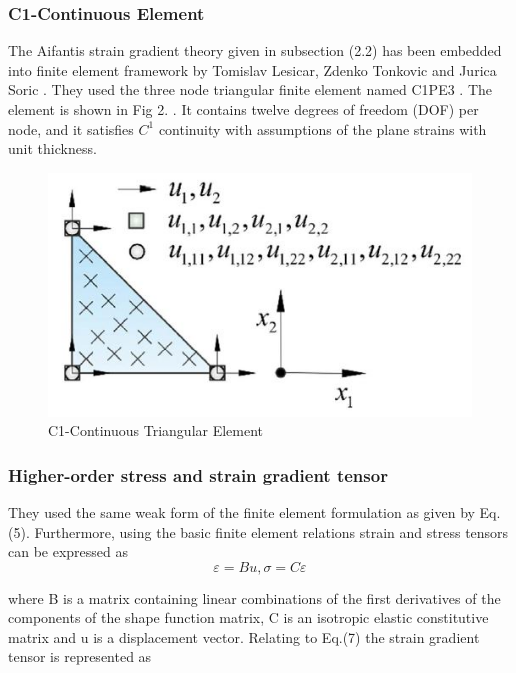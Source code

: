 \documentclass[12pt]{article}
\begin{document}
\subsubsection{ C1-Continuous Element}
The Aifantis strain gradient theory given in subsection (2.2) has been embedded into finite element framework by Tomislav Lesicar, Zdenko Tonkovic and Jurica Soric \cite{lesivcar2017two}. They used the three node triangular finite element named C1PE3 \cite{putar2017damage}. The element is shown in
Fig 2. \cite{putar2017damage}. It contains twelve degrees of freedom (DOF) per node, and it satisfies $C^1$ continuity with assumptions of the plane strains with unit thickness.
\newline
     \begin{figure}[H]
     	\begin{center}
	      \includegraphics[scale=0.8]{Tri_Element.JPG}  
	    \end{center}  
        \caption{C1-Continuous Triangular Element \cite{putar2017damage}}
     \end{figure}
\subsubsection{ Higher-order stress and strain gradient tensor} 
They used the same weak form of the finite element formulation as given by Eq.(5). Furthermore, using the basic finite element relations strain and stress tensors can be expressed as
\begin{equation}
\varepsilon = Bu,      \sigma=C\varepsilon
\end{equation}
\newline

where B is a matrix containing linear combinations of the first derivatives of the components of the shape function matrix, C is an isotropic elastic constitutive matrix and u  is a displacement vector. Relating to Eq.(7) the strain gradient tensor is represented as
\end{document}
